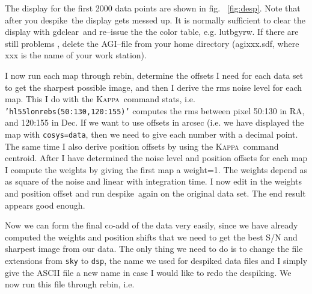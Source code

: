 \documentclass[twoside,11pt]{article}
\newcommand{\Kappa}{\xref{\textsc{Kappa}}{sun95}{}}
\newcommand{\agi}{\xref{AGI}{sun48}{}}
\newcommand{\task}[1]{\textsf{#1}}
\newcommand{\rebin}{\xref{\task{rebin}}{sun216}{REBIN}}
\newcommand{\desp}{\xref{\task{despike}}{sun216}{DESPIKE}}
\newcommand{\centroid}{\xref{\task{centroid}}{sun95}{CENTROID}}
\newcommand{\stats}{\xref{\task{stats}}{sun95}{STATS}}
\newcommand{\gdclear}{\xref{\task{gdclear}}{sun95}{GDCLEAR}}
\newcommand{\lutbgyrw}{\xref{\task{lutbgyrw}}{sun95}{LUTBGYRW}}
\newcommand{\xref}[3]{#1}
\renewcommand{\_}{\texttt{\symbol{95}}}
\begin{document}
The display for the first 2000 data points are shown in fig.
\ \ref{fig:desp}.  Note that after you \desp\ the display gets messed
up. It is normally sufficient to clear the display with \gdclear\ and
re--issue the the color table, e.g. \lutbgyrw. If there are still
problems , delete the \agi--file from your home directory
(agi\_xxx.sdf, where xxx is the name of your work station).

I now run each map through \rebin, determine the offsets I need for
each data set to get the sharpest possible image, and then I derive the
rms noise level for each map. This I do with the \Kappa\ command
\stats, i.e.  \texttt{'hl55\_lon\_rebs(50:130,120:155)'} computes the
rms between pixel 50:130 in RA, and 120:155 in Dec. If we want to use
offsets in arcsec (i.e.  we have displayed the map with
\texttt{cosys=data}, then we need to give each number with a decimal
point. The same time I also derive position offsets by using the
\Kappa\ command \centroid. After I have determined the noise level and
position offsets for each map I compute the weights by giving the first
map a weight=1. The weights depend as as square of the noise and linear
with integration time. I now edit in the weights and position offset
and run \desp\ again on the original data set. The end result appears
good enough.

Now we can form the final co-add of the data very easily, since we have
already computed the weights and position shifts that we need to get
the best S/N and sharpest image from our data. The only thing we need
to do is to change the file extensions from \texttt{sky} to
\texttt{dsp}, the name we used for despiked data files and I simply give
the ASCII file a new name in case I would like to redo the despiking. We
now run this file through \rebin, i.e.
\end{document}
